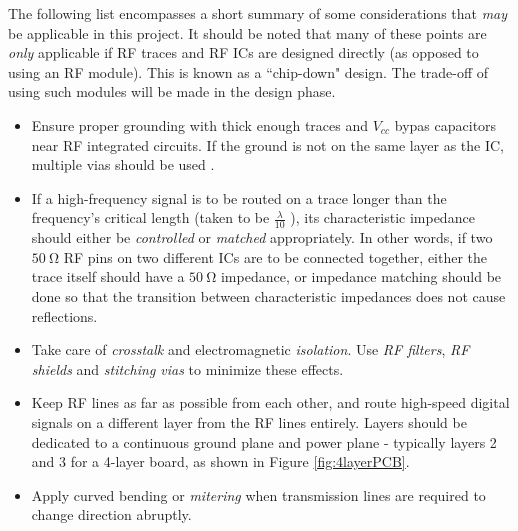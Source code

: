 The following list encompasses a short summary of some considerations that \textit{may} be applicable in this project. It should be noted that many of these points are \textit{only} applicable if RF traces and RF ICs are designed directly (as opposed to using an RF module). This is known as a ``chip-down" design. The trade-off of using such modules will be made in the design phase.
\begin{itemize}
    \item Ensure proper grounding with thick enough traces and $V_{cc}$ bypas capacitors near RF integrated circuits. If the ground is not on the same layer as the IC, multiple vias should be used \cite{datasheet-MAX2659}. 
    \item If a high-frequency signal is to be routed on a trace longer than the frequency's critical length (taken to be $\frac{\lambda}{10}$ \cite{site-pcbRoutingGuidelines}), its characteristic impedance should either be \textit{controlled} or \textit{matched} appropriately. In other words, if two $\SI{50}{\ohm}$ RF pins on two different ICs are to be connected together, either the trace itself should have a $\SI{50}{\ohm}$ impedance, or impedance matching should be done so that the transition between characteristic impedances does not cause reflections. \cite{datasheet-MAX2659}
    \item Take care of \textit{crosstalk} and electromagnetic \textit{isolation}. Use \textit{RF filters}, \textit{RF shields} and \textit{stitching vias} to minimize these effects.
    \item Keep RF lines as far as possible from each other, and route high-speed digital signals on a different layer from the RF lines entirely. Layers should be dedicated to a continuous ground plane and power plane - typically layers 2 and 3 for a 4-layer board, as shown in Figure \ref{fig:4layerPCB}. \cite{site-rfPCBGuidelines}
    \item Apply curved bending or \textit{mitering} when transmission lines are required to change direction abruptly. \cite{site-rfPCBGuidelines}
\end{itemize}